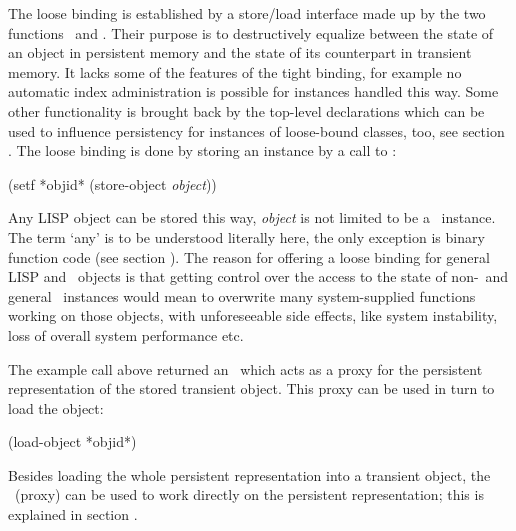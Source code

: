 The loose binding is established by a store/load interface made up by
the two functions \ and
.  Their purpose is to destructively
equalize between the state of an object in persistent memory and the
state of its counterpart in transient memory.  It lacks some of the
features of the tight binding, for example no automatic index
administration is possible for instances handled this way. Some other
functionality is brought back by the top-level declarations which can
be used to influence persistency for instances of loose-bound classes,
too, see section . The loose binding is
done by storing an instance by a call to :
\begin{CompactCode}
\listener{}(setf *objid* (store-object \textrm{\emph{\lt{}object\gt}}))
\end{CompactCode}

Any LISP object can be stored this way, \emph{\lt{}object\gt} is not
limited to be a \clos\ instance. The term `any' is to be understood
literally here, the only exception is binary function code (see
section ).  The reason for offering a loose
binding for general LISP and \clos\ objects is that getting control
over the access to the state of non-\clos\ and general \clos\ 
instances would mean to overwrite many system-supplied functions
working on those objects, with unforeseeable side effects, like system
instability, loss of overall system performance etc.

The example call above returned an \objid\ which acts as a proxy for
the persistent representation of the stored transient object. This
proxy can be used in turn to load the object:
\begin{CompactCode}
\listener{}(load-object *objid*) 
\comment{;; For the string stored above,}
\end{CompactCode}
Besides loading the whole persistent representation into a transient
object, the \objid\ (proxy) can be used to work directly on the
persistent representation; this is explained in
section .

